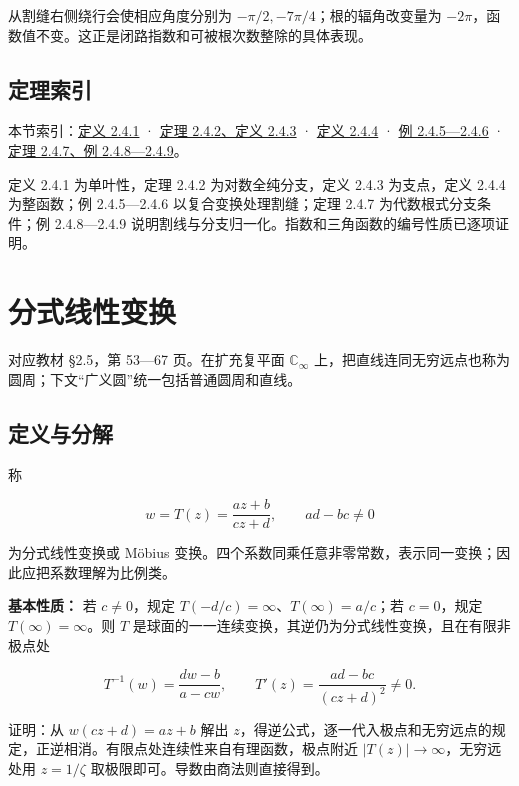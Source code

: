 \documentclass[11pt,a4paper]{article}
\begin{document}
从割缝右侧绕行会使相应角度分别为 \(-\pi/2,-7\pi/4\)；根的辐角改变量为
\(-2\pi\)，函数值不变。这正是闭路指数和可被根次数整除的具体表现。

\subsection{定理索引}\label{ch02-s4-ux5b9aux7406ux7d22ux5f15}

本节索引：\hyperref[ch02-s4-ux6307ux6570ux51fdux6570]{定义 2.4.1} ·
\hyperref[ch02-s4-ux5bf9ux6570ux51fdux6570]{定理 2.4.2、定义 2.4.3} ·
\hyperref[ch02-s4-ux5e42ux51fdux6570]{定义 2.4.4} ·
\hyperref[ch02-s4-ux5272ux7f1dux57dfux7684ux6620ux5c04ux6784ux9020]{例
2.4.5---2.4.6} · \hyperref[ch02-s4-ux4ee3ux6570ux591aux503cux51fdux6570]{定理
2.4.7、例 2.4.8---2.4.9}。

定义 2.4.1 为单叶性，定理 2.4.2 为对数全纯分支，定义 2.4.3 为支点，定义
2.4.4 为整函数；例 2.4.5---2.4.6 以复合变换处理割缝；定理 2.4.7
为代数根式分支条件；例 2.4.8---2.4.9
说明割线与分支归一化。指数和三角函数的编号性质已逐项证明。

\section{分式线性变换}
对应教材 §2.5，第 53---67 页。在扩充复平面 \(\mathbb C_\infty\)
上，把直线连同无穷远点也称为圆周；下文``广义圆''统一包括普通圆周和直线。

\subsection{定义与分解}\label{ch02-s5-ux5b9aux4e49ux4e0eux5206ux89e3}

称

\[
w=T(z)=\frac{az+b}{cz+d},\qquad ad-bc\ne0
\]

为分式线性变换或 Möbius
变换。四个系数同乘任意非零常数，表示同一变换；因此应把系数理解为比例类。

\textbf{基本性质：} 若 \(c\ne0\)，规定
\(T(-d/c)=\infty\)、\(T(\infty)=a/c\)；若 \(c=0\)，规定
\(T(\infty)=\infty\)。则 \(T\)
是球面的一一连续变换，其逆仍为分式线性变换，且在有限非极点处

\[
T^{-1}(w)=\frac{dw-b}{a-cw},\qquad T'(z)=\frac{ad-bc}{(cz+d)^2}\ne0.
\]

证明：从 \(w(cz+d)=az+b\) 解出
\(z\)，得逆公式，逐一代入极点和无穷远点的规定，正逆相消。有限点处连续性来自有理函数，极点附近
\(|T(z)|\to\infty\)，无穷远处用 \(z=1/\zeta\)
取极限即可。导数由商法则直接得到。
\end{document}
